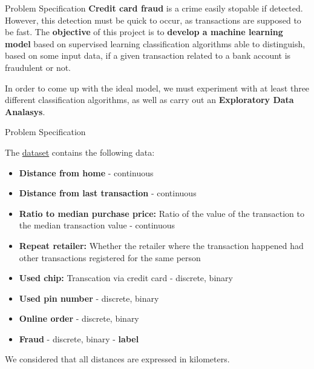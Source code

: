 
\begin{frame}{Problem Specification}
    \textbf{Credit card fraud} is a crime easily stopable if detected. However, this detection must be quick to occur, as transactions are supposed to be fast. The \textbf{objective} of this project is to \textbf{develop a machine learning model} based on supervised learning classification algorithms able to distinguish, based on some input data, if a given transaction related to a bank account is fraudulent or not. 
        \vspace{0.5em}
        
    In order to come up with the ideal model, we must experiment with at least three different classification algorithms, as well as carry out an \textbf{Exploratory Data Analasys}.

\end{frame}


\begin{frame}{Problem Specification}

    The \href{https://www.kaggle.com/datasets/dhanushnarayananr/credit-card-fraud}{dataset} contains the following data:
    
    \vspace{0.5}
    
    \begin{itemize}
        \item \textbf{Distance from home} - continuous
        \item \textbf{Distance from last transaction} - continuous
        \item \textbf{Ratio to median purchase price: } Ratio of the value of the transaction to the median transaction value - continuous
        \item \textbf{Repeat retailer:} Whether the retailer where the transaction happened had other transactions registered for the same person
        \item \textbf{Used chip:} Transcation via credit card - discrete, binary
        \item \textbf{Used pin number} - discrete, binary
        \item \textbf{Online order} - discrete, binary
        \item \textbf{Fraud} - discrete, binary - \textbf{label}
    \end{itemize}
    We considered that all distances are expressed in kilometers.
\end{frame}